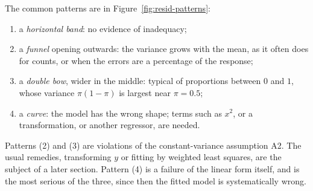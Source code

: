\documentclass[11pt,a4paper]{article}
\numberwithin{equation}{section}
\theoremstyle{definition}
\begin{document}
The common patterns are in Figure~\ref{fig:resid-patterns}:
\begin{enumerate}[label=(\arabic*)]
\item a \emph{horizontal band}: no evidence of inadequacy;
\item a \emph{funnel} opening outwards: the variance grows with the mean, as it often does
for counts, or when the errors are a percentage of the response;
\item a \emph{double bow}, wider in the middle: typical of proportions between $0$ and $1$,
whose variance $\pi(1 - \pi)$ is largest near $\pi = 0.5$;
\item a \emph{curve}: the model has the wrong shape; terms such as $x^2$, or a
transformation, or another regressor, are needed.
\end{enumerate}
Patterns (2) and (3) are violations of the constant-variance assumption A2. The usual
remedies, transforming $y$ or fitting by weighted least squares, are the subject of a later
section. Pattern (4) is a failure of the linear form itself, and is the most serious of the
three, since then the fitted model is systematically wrong.
\end{document}
